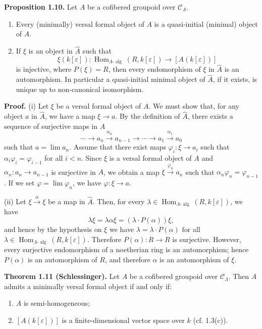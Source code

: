 \documentclass[11pt]{article}
\providecommand{\Hom}{\operatorname{Hom}}
\providecommand{\CL}{\mathcal C_\Lambda}
\providecommand{\alg}{\operatorname{alg}}
\begin{document}
\textbf{Proposition 1.10.} Let $A$ be a cofibered groupoid over $\CL$.
\begin{enumerate}[label=(\roman*)]
\item Every (minimally) versal formal object of $A$ is a quasi-initial (minimal) object of $\widehat A$.
\item If $\xi$ is an object in $\widehat A$ such that
\[
 \xi(k[\varepsilon]):\Hom_{\Lambda\text{-}\alg}(R,k[\varepsilon])\longrightarrow [A(k[\varepsilon])]
\]
is injective, where $P(\xi)=R$, then every endomorphism of $\xi$ in $\widehat A$ is an automorphism. In particular a quasi-initial minimal object of $\widehat A$, if it exists, is unique up to non-canonical isomorphism.
\end{enumerate}

\textbf{Proof.} (i) Let $\xi$ be a versal formal object of $A$. We must show that, for any object $a$ in $\widehat A$, we have a map $\xi\to a$. By the definition of $\widehat A$, there exists a sequence of surjective maps in $A$
\[
 \cdots\longrightarrow a_n\xrightarrow{\alpha_n}a_{n-1}\longrightarrow\cdots\longrightarrow a_1\xrightarrow{\alpha_1}a_0
\]
such that $a=\lim a_n$. Assume that there exist maps $\varphi_i:\xi\to a_i$ such that $\alpha_i\varphi_i=\varphi_{i-1}$ for all $i<n$. Since $\xi$ is a versal formal object of $A$ and $\alpha_n:a_n\to a_{n-1}$ is surjective in $A$, we obtain a map $\xi\xrightarrow{\varphi_n}a_n$ such that $\alpha_n\varphi_n=\varphi_{n-1}$. If we set $\varphi=\lim \varphi_n$, we have $\varphi:\xi\to a$.

(ii) Let $\xi\xrightarrow{\alpha}\xi$ be a map in $\widehat A$. Then, for every $\lambda\in\Hom_{\Lambda\text{-}\alg}(R,k[\varepsilon])$, we have
\[
 \lambda\xi=\lambda\alpha\xi=(\lambda\cdot P(\alpha))\xi,
\]
and hence by the hypothesis on $\xi$ we have $\lambda=\lambda\cdot P(\alpha)$ for all $\lambda\in\Hom_{\Lambda\text{-}\alg}(R,k[\varepsilon])$. Therefore $P(\alpha):R\to R$ is surjective. However, every surjective endomorphism of a noetherian ring is an automorphism; hence $P(\alpha)$ is an automorphism of $R$, and therefore $\alpha$ is an automorphism of $\xi$.

\textbf{Theorem 1.11 (Schlessinger).} Let $A$ be a cofibered groupoid over $\CL$. Then $A$ admits a minimally versal formal object if and only if:
\begin{enumerate}[label=(\roman*)]
\item $A$ is semi-homogeneous;
\item $[A(k[\varepsilon])]$ is a finite-dimensional vector space over $k$ (cf. 1.3(c)).
\end{enumerate}
\end{document}
